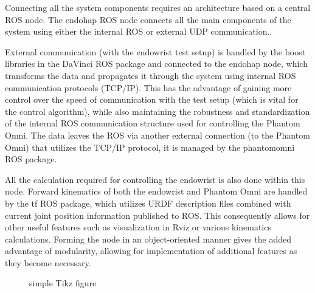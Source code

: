 
	
\raggedbottom

Connecting all the system components requires an architecture based on a central ROS node.
The endohap ROS node connects all the main components of the system using either the internal ROS or external UDP communication..

External communication (with the endowrist test setup) is handled by the boost libraries in the DaVinci ROS package and connected to the endohap node, which transforms the data and propagates it through the system using internal ROS communication protocols (TCP/IP). 
This has the advantage of gaining more control over the speed of communication with the test setup (which is vital for the control algorithm), while also maintaining the robustness and standardization of the internal ROS communication structure used for controlling the Phantom Omni. The data leaves the ROS via another external connection (to the Phantom Omni) that utilizes the TCP/IP protocol, it is managed by the phantomomni ROS package.

All the calculation required for controlling the endowrist is also done within this node. Forward kinematics of both the endowrist and Phantom Omni are handled by the tf ROS package, which utilizes URDF description files combined with current joint position information published to ROS.
This consequently allows for other useful features such as visualization in Rviz or various kinematics calculations.
Forming the node in an object-oriented manner gives the added advantage of modularity, allowing for implementation of additional features as they become necessary. 

\begin{figure}
\center
{}%
\caption{simple Tikz figure}
\end{figure}


\appendix

\clearpage



